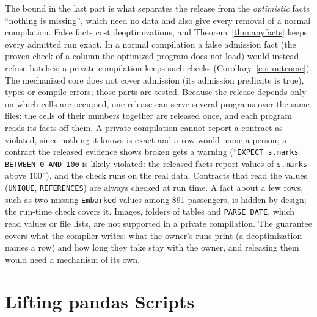 The bound in the last part is what separates the release from the \emph{optimistic} facts ``nothing is
missing'', which need no data and also give every removal of a normal compilation. False facts cost
deoptimizations, and Theorem~\ref{thm:anyfacts} keeps every admitted run exact. In a normal
compilation a false admission fact (the proven check of a column the optimized program does not load)
would instead refuse batches; a private compilation keeps such checks (Corollary~\ref{cor:outcome}). The
mechanized core does not cover admission (its admission predicate is true), types or compile errors;
those parts are tested. Because the release depends only on which cells are occupied, one release can serve
several programs over the same files: the cells of their numbers together are released once, and each
program reads its facts off them. A private compilation cannot report a contract as violated, since
nothing it knows is exact and a row would name a person; a contract the released evidence shows broken
gets a warning (``\texttt{EXPECT s.marks BETWEEN 0 AND 100} is likely violated: the released facts
report values of \texttt{s.marks} above 100''), and the check runs on the real data. Contracts that read
the values (\texttt{UNIQUE}, \texttt{REFERENCES}) are always checked at run time. A fact about a few rows,
such as two missing \texttt{Embarked} values among 891 passengers, is hidden by design; the run-time check
covers it. Images, folders of tables and \texttt{PARSE\_DATE}, which read values or file lists, are not
supported in a private compilation. The guarantee covers what the compiler writes: what the owner's runs
print (a deoptimization names a row) and how long they take stay with the owner, and releasing them would
need a mechanism of its own.

\section{Lifting pandas Scripts}\label{sec:lift}

